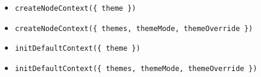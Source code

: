 \begin{itemize}
\tightlist
\item
  \texttt{c\allowbreak{}r\allowbreak{}e\allowbreak{}a\allowbreak{}t\allowbreak{}e\allowbreak{}N\allowbreak{}o\allowbreak{}d\allowbreak{}e\allowbreak{}C\allowbreak{}o\allowbreak{}n\allowbreak{}t\allowbreak{}e\allowbreak{}x\allowbreak{}t\allowbreak{}(\allowbreak{}\{\allowbreak{} \allowbreak{}t\allowbreak{}h\allowbreak{}e\allowbreak{}m\allowbreak{}e\allowbreak{} \allowbreak{}\}\allowbreak{})}
\item
  \texttt{c\allowbreak{}r\allowbreak{}e\allowbreak{}a\allowbreak{}t\allowbreak{}e\allowbreak{}N\allowbreak{}o\allowbreak{}d\allowbreak{}e\allowbreak{}C\allowbreak{}o\allowbreak{}n\allowbreak{}t\allowbreak{}e\allowbreak{}x\allowbreak{}t\allowbreak{}(\allowbreak{}\{\allowbreak{} \allowbreak{}t\allowbreak{}h\allowbreak{}e\allowbreak{}m\allowbreak{}e\allowbreak{}s\allowbreak{},\allowbreak{} \allowbreak{}t\allowbreak{}h\allowbreak{}e\allowbreak{}m\allowbreak{}e\allowbreak{}M\allowbreak{}o\allowbreak{}d\allowbreak{}e\allowbreak{},\allowbreak{} \allowbreak{}t\allowbreak{}h\allowbreak{}e\allowbreak{}m\allowbreak{}e\allowbreak{}O\allowbreak{}v\allowbreak{}e\allowbreak{}r\allowbreak{}r\allowbreak{}i\allowbreak{}d\allowbreak{}e\allowbreak{} \allowbreak{}\}\allowbreak{})}
\item
  \texttt{i\allowbreak{}n\allowbreak{}i\allowbreak{}t\allowbreak{}D\allowbreak{}e\allowbreak{}f\allowbreak{}a\allowbreak{}u\allowbreak{}l\allowbreak{}t\allowbreak{}C\allowbreak{}o\allowbreak{}n\allowbreak{}t\allowbreak{}e\allowbreak{}x\allowbreak{}t\allowbreak{}(\allowbreak{}\{\allowbreak{} \allowbreak{}t\allowbreak{}h\allowbreak{}e\allowbreak{}m\allowbreak{}e\allowbreak{} \allowbreak{}\}\allowbreak{})}
\item
  \texttt{i\allowbreak{}n\allowbreak{}i\allowbreak{}t\allowbreak{}D\allowbreak{}e\allowbreak{}f\allowbreak{}a\allowbreak{}u\allowbreak{}l\allowbreak{}t\allowbreak{}C\allowbreak{}o\allowbreak{}n\allowbreak{}t\allowbreak{}e\allowbreak{}x\allowbreak{}t\allowbreak{}(\allowbreak{}\{\allowbreak{} \allowbreak{}t\allowbreak{}h\allowbreak{}e\allowbreak{}m\allowbreak{}e\allowbreak{}s\allowbreak{},\allowbreak{} \allowbreak{}t\allowbreak{}h\allowbreak{}e\allowbreak{}m\allowbreak{}e\allowbreak{}M\allowbreak{}o\allowbreak{}d\allowbreak{}e\allowbreak{},\allowbreak{} \allowbreak{}t\allowbreak{}h\allowbreak{}e\allowbreak{}m\allowbreak{}e\allowbreak{}O\allowbreak{}v\allowbreak{}e\allowbreak{}r\allowbreak{}r\allowbreak{}i\allowbreak{}d\allowbreak{}e\allowbreak{} \allowbreak{}\}\allowbreak{})}
\end{itemize}

